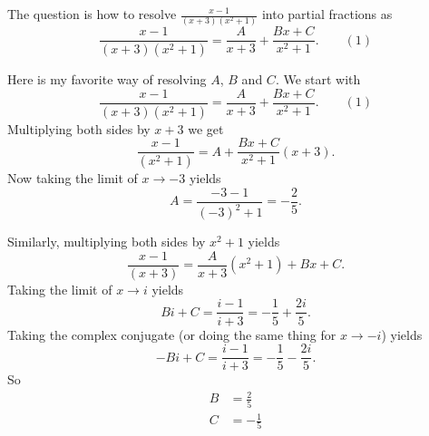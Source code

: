 \documentclass{article}
\begin{document}
The question is how to resolve $\frac{x - 1}{(x+3)(x^2+1)}$
into partial fractions as
$$
\frac{x - 1}{(x+3)(x^2+1)} =
\frac{A}{x+3} + \frac{Bx+ C}{x^2+1}.
\qquad (1)
$$

Here is my favorite way of resolving $A$, $B$ and $C$.
We start with
$$
\frac{x - 1}{(x+3)(x^2+1)} =
\frac{A}{x+3} + \frac{Bx+ C}{x^2+1}.
\qquad (1)
$$
Multiplying both sides by $x+3$ we get
$$
\frac{x - 1}{(x^2+1)} =
A + \frac{Bx+ C}{x^2+1} (x+3).
$$
Now taking the limit of $x \rightarrow -3$ yields
\begin{equation}
A = \frac{-3-1}{(-3)^2 + 1} = -\frac{2}{5}.
\end{equation}

Similarly, multiplying both sides by $x^2 + 1$ yields
$$
\frac{x - 1}{(x+3)} =
\frac{A}{x+3}(x^2+1) + Bx+ C.
$$
Taking the limit of $x\rightarrow i$ yields
$$
B i + C = \frac{i - 1}{i + 3} = -\frac{1}{5} + \frac{2 i}{5}.
$$
Taking the complex conjugate (or doing the same thing for $x \rightarrow -i$) yields
$$
-B i + C = \frac{i - 1}{i + 3} = -\frac{1}{5} - \frac{2 i}{5}.
$$
So
\begin{align}
B &= \frac{2}{5} \\
C &= -\frac{1}{5}
\end{align}
\end{document}
